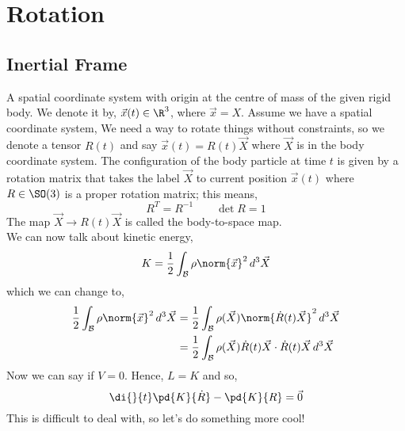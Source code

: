 
\section{Rotation}
\subsection{Inertial Frame}
A spatial coordinate system with origin at the centre of mass of the given rigid body. We denote it by, $\vec{x}(t) \in \R^3$, where $\vec x = X$. Assume we have a spatial coordinate system,
We need a way to rotate things without constraints, so we denote a tensor $R(t)$ and say $\vec x(t) = R(t)\vec X$ where $\vec X$ is in the body coordinate system. The configuration of the body particle at time $t$ is given by a rotation matrix that takes the label $\vec X$ to current position $\vec x(t)$ where $R \in \SO(3)$ is a proper rotation matrix; this means,
$$ R^T = R^{-1} \qquad \det R = 1 $$
The map $\vec X \to R(t)\vec X$ is called the body-to-space map. \\

We can now talk about kinetic energy,
$$ K = \frac{1}{2}\int_\mathcal{B} \rho \norm{\vec x}^2\, d^3\vec X$$
which we can change to,
\begin{align*}
  \frac{1}{2}\int_\mathcal{B} \rho \norm{\vec x}^2\, d^3\vec X &= \frac{1}{2}\int_\mathcal{B} \rho(\vec X)\norm{\dot R(t)\vec X}^2 \,d^3\vec X\\
  &= \frac{1}{2}\int_\mathcal{B} \rho(\vec X)\dot R(t)\vec X \cdot \dot R(t)\vec X \,d^3\vec X\\
\end{align*}
Now we can say if $V = 0$. Hence, $L = K$ and so,
$$ \di{}{t}\pd{K}{\dot R} - \pd{K}{R} = \vec 0 $$
This is difficult to deal with, so let's do something more cool! \\

